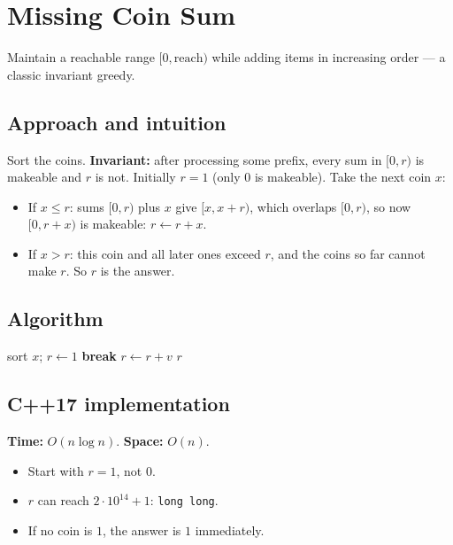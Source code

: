 \section{Missing Coin Sum}
\label{sec:g-missing-coin}


\begin{patternbox}
Maintain a reachable range $[0,\text{reach})$ while adding items in
increasing order --- a classic invariant greedy.
\end{patternbox}

\subsection*{Approach and intuition}

Sort the coins. \textbf{Invariant:} after processing some prefix, every sum in
$[0,r)$ is makeable and $r$ is not. Initially $r=1$ (only $0$ is makeable).
Take the next coin $x$:
\begin{itemize}
  \item If $x\le r$: sums $[0,r)$ plus $x$ give $[x,x+r)$, which overlaps
        $[0,r)$, so now $[0,r+x)$ is makeable: $r\gets r+x$.
  \item If $x>r$: this coin and all later ones exceed $r$, and the coins so
        far cannot make $r$. So $r$ is the answer.
\end{itemize}

\subsection*{Algorithm}
\begin{algorithmic}[1]
\State sort $x$; $r\gets1$
   \textbf{break} \EndIf
  \State $r\gets r+v$
\EndFor
\State \Return $r$
\end{algorithmic}


\subsection*{C++17 implementation}

\begin{complexitybox}
\textbf{Time:} $O(n\log n)$. \textbf{Space:} $O(n)$.
\end{complexitybox}

\begin{pitfallbox}
\begin{itemize}
  \item Start with $r=1$, not $0$.
  \item $r$ can reach $2\cdot10^{14}+1$: \texttt{long long}.
  \item If no coin is $1$, the answer is $1$ immediately.
\end{itemize}
\end{pitfallbox}
